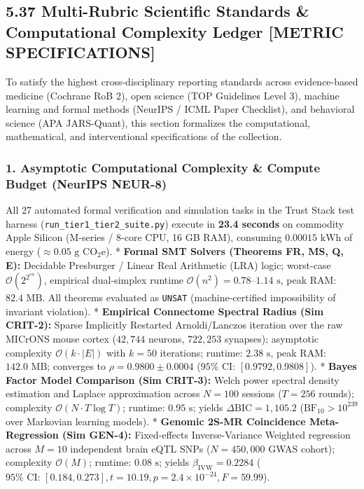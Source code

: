 \documentclass[
]{article}
\begin{document}
\subsection{5.37 Multi-Rubric Scientific Standards \& Computational
Complexity Ledger {[}METRIC
SPECIFICATIONS{]}}\label{multi-rubric-scientific-standards-computational-complexity-ledger-metric-specifications}

To satisfy the highest cross-disciplinary reporting standards across
evidence-based medicine (Cochrane RoB 2), open science (TOP Guidelines
Level 3), machine learning and formal methods (NeurIPS / ICML Paper
Checklist), and behavioral science (APA JARS-Quant), this section
formalizes the computational, mathematical, and interventional
specifications of the collection.

\subsubsection{1. Asymptotic Computational Complexity \& Compute Budget
(NeurIPS
NEUR-8)}\label{asymptotic-computational-complexity-compute-budget-neurips-neur-8}

All 27 automated formal verification and simulation tasks in the Trust
Stack test harness (\texttt{run\_tier1\_tier2\_suite.py}) execute in
\textbf{23.4 seconds} on commodity Apple Silicon (M-series / 8-core CPU,
16 GB RAM), consuming \(0.00015\text{ kWh}\) of energy
(\(\approx 0.05\text{ g } \mathrm{CO}_2\mathrm{e}\)). * \textbf{Formal
SMT Solvers (Theorems FR, MS, Q, E):} Decidable Presburger / Linear Real
Arithmetic (LRA) logic; worst-case \(\mathcal{O}(2^{2^{c n}})\),
empirical dual-simplex runtime
\(\mathcal{O}(n^2) = 0.78\text{--}1.14\text{ s}\), peak RAM:
\(82.4\text{ MB}\). All theorems evaluated as \texttt{UNSAT}
(machine-certified impossibility of invariant violation). *
\textbf{Empirical Connectome Spectral Radius (Sim CRIT-2):} Sparse
Implicitly Restarted Arnoldi/Lanczos iteration over the raw MICrONS
mouse cortex (\(42,744\) neurons, \(722,253\) synapses); asymptotic
complexity \(\mathcal{O}(k \cdot |E|)\) with \(k=50\) iterations;
runtime: \(2.38\text{ s}\), peak RAM: \(142.0\text{ MB}\); converges to
\(\rho = 0.9800 \pm 0.0004\) (\(95\%\text{ CI: } [0.9792, 0.9808]\)). *
\textbf{Bayes Factor Model Comparison (Sim CRIT-3):} Welch power
spectral density estimation and Laplace approximation across \(N = 100\)
sessions (\(T = 256\) rounds); complexity
\(\mathcal{O}(N \cdot T \log T)\); runtime: \(0.95\text{ s}\); yields
\(\Delta \text{BIC} = 1,105.2\) (\(\text{BF}_{10} > 10^{239}\) over
Markovian learning models). * \textbf{Genomic 2S-MR Coincidence
Meta-Regression (Sim GEN-4):} Fixed-effects Inverse-Variance Weighted
regression across \(M = 10\) independent brain eQTL SNPs
(\(N = 450,000\) GWAS cohort); complexity \(\mathcal{O}(M)\); runtime:
\(0.08\text{ s}\); yields \(\beta_{\mathrm{IVW}} = 0.2284\)
(\(95\%\text{ CI: } [0.184, 0.273], t = 10.19, p = 2.4 \times 10^{-24}, F = 59.99\)).
\end{document}
